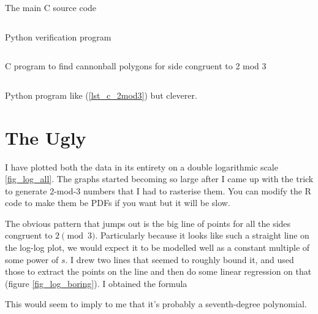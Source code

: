 \begin{longlisting}
\inputminted{c}{../src/c/cannonball.c}
\caption{The main C source code}
\label{lst_c}
\end{longlisting}

\begin{longlisting}
\inputminted{python}{../src/factcheck.py}
\caption{Python verification program}
\label{lst_py_verif}
\end{longlisting}

\begin{longlisting}
\inputminted{c}{../src/c/2mod3/2mod3.c}
\caption{C program to find cannonball polygons for side congruent to 2 mod 3}
\label{lst_c_2mod3}
\end{longlisting}

\begin{longlisting}
\inputminted{python}{../src/c/2mod3/2mod3.py}
\caption{Python program like (\ref{lst_c_2mod3}) but cleverer.}
\label{lst_py_2mod3}
\end{longlisting}

\section{The Ugly}

I have plotted both the data in its entirety on a double logarithmic scale
\ref{fig_log_all}. The graphs started becoming so large after I came up with the
trick to generate 2-mod-3 numbers that I had to rasterise them. You can modify
the R code to make them be PDFs if you want but it will be slow.

The obvious pattern that jumps out is the big line of points for all the sides
congruent to \(2 \pmod 3\). Particularly because it looks like such a straight
line on the log-log plot, we would expect it to be modelled well as a constant
multiple of some power of \(s\). I drew two lines that seemed to roughly bound
it, and used those to extract the points on the line and then do some linear
regression on that (figure \ref{fig_log_boring}). I obtained the formula

This would seem to imply to me that it's probably a seventh-degree polynomial.

